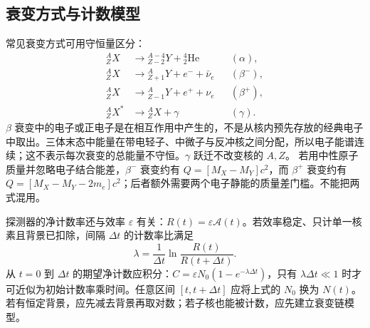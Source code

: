 \subsection{衰变方式与计数模型}
常见衰变方式可用守恒量区分：
\begin{align*}
 {}^A_ZX&\to{}^{A-4}_{Z-2}Y+{}^4_2\mathrm{He} &&(\alpha),\\
 {}^A_ZX&\to{}^A_{Z+1}Y+e^-+\bar\nu_e &&(\beta^-),\\
 {}^A_ZX&\to{}^A_{Z-1}Y+e^++\nu_e &&(\beta^+),\\
 {}^A_ZX^*&\to{}^A_ZX+\gamma &&(\gamma).
\end{align*}
$\beta$ 衰变中的电子或正电子是在相互作用中产生的，不是从核内预先存放的经典电子中取出。三体末态中能量在带电轻子、中微子与反冲核之间分配，所以电子能谱连续；这不表示每次衰变的总能量不守恒。$\gamma$ 跃迁不改变核的 $A,Z$。
若用中性原子质量并忽略电子结合能差，$\beta^-$ 衰变约有 $Q=[M_X-M_Y]c^2$，而 $\beta^+$ 衰变约有 $Q=[M_X-M_Y-2m_e]c^2$；后者额外需要两个电子静能的质量差门槛。不能把两式混用。

探测器的净计数率还与效率 $\varepsilon$ 有关：$R(t)=\varepsilon\mathcal A(t)$。若效率稳定、只计单一核素且背景已扣除，间隔 $\Delta t$ 的计数率比满足
\[
 \lambda=\frac1{\Delta t}\ln\frac{R(t)}{R(t+\Delta t)}.
\]
从 $t=0$ 到 $\Delta t$ 的期望净计数应积分：$C=\varepsilon N_0(1-e^{-\lambda\Delta t})$，只有 $\lambda\Delta t\ll1$ 时才可近似为初始计数率乘时间。任意区间 $[t,t+\Delta t]$ 应将上式的 $N_0$ 换为 $N(t)$。若有恒定背景，应先减去背景再取对数；若子核也能被计数，应先建立衰变链模型。
